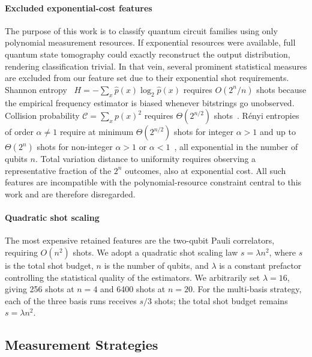 \documentclass[conference]{IEEEtran}
\newcommand{\nqubits}{n}
\newcommand{\shots}{s}
\begin{document}
\paragraph{Excluded exponential-cost features}
The purpose of this work is to classify quantum circuit families using only
polynomial measurement resources.
If exponential resources were available, full quantum state tomography could exactly
reconstruct the output distribution, rendering classification trivial.
In that vein, several prominent statistical measures are excluded from our feature set
due to their exponential shot requirements.
Shannon entropy~\cite{bromiley2004shannon} $H = -\sum_x \hat{p}(x)\log_2 \hat{p}(x)$
requires $O(2^\nqubits / \nqubits)$ shots because the empirical frequency estimator
is biased whenever bitstrings go unobserved.
Collision probability $\mathcal{C} = \sum_x p(x)^2$ requires $\Theta(2^{\nqubits/2})$
shots~\cite{Canonne2020}.
R\'{e}nyi entropies of order $\alpha \neq 1$ require at minimum
$\Theta(2^{\nqubits/2})$ shots for integer $\alpha > 1$ and up to
$\Theta(2^\nqubits)$ shots for non-integer $\alpha > 1$ or $\alpha < 1$~\cite{Archarya2017estimating},
all exponential in the number of qubits $\nqubits$.
Total variation distance to uniformity requires observing a representative fraction
of the $2^\nqubits$ outcomes, also at exponential cost.
All such features are incompatible with the polynomial-resource constraint central
to this work and are therefore disregarded.

\paragraph{Quadratic shot scaling}
The most expensive retained features are the two-qubit Pauli correlators, requiring $O(\nqubits^2)$ shots.
We adopt a quadratic shot scaling law $\shots = \lambda \nqubits^2$, where $\shots$ is the total shot budget, $\nqubits$ is the number of qubits, and $\lambda$ is a constant prefactor controlling the statistical quality of the estimators.
We arbitrarily set $\lambda = 16$, giving 256 shots at $\nqubits = 4$ and 6400 shots at $\nqubits = 20$.
For the multi-basis strategy, each of the three basis runs receives $\shots / 3$ shots; the total shot budget remains $\shots = \lambda\nqubits^2$.

\subsection{Measurement Strategies}
\label{sec:strategies}
\end{document}
